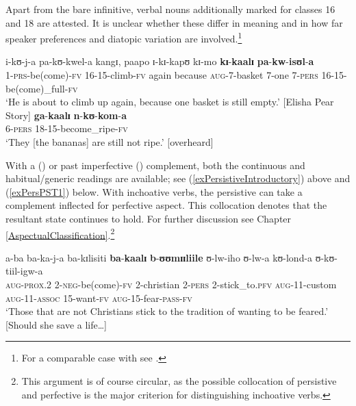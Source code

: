 \newpage 
Apart from the bare infinitive, verbal nouns additionally marked for  classes 16 and 18 are attested. It is unclear whether these differ in meaning and in how far speaker preferences and diatopic variation are involved.\footnote{For a comparable case with  see .}

\begin{exe}
\ex \label{exPers16INF}
\gll i-kʊ-j-a pa-kʊ-kwel-a kangɪ, paapo ɪ-kɪ-kapʊ kɪ-mo \textbf{kɪ}-\textbf{kaalɪ} \textbf{pa}-\textbf{kw}-\textbf{isʊl}-\textbf{a}\\
1-\textsc{prs}-be(come)-\textsc{fv} 16-15-climb-\textsc{fv} again because \textsc{aug}-7-basket 7-one 7-\textsc{pers} 16-15-be(come)\_full-\textsc{fv}\\
\glt \lq He is about to climb up again, because one basket is still empty.' [Elisha Pear Story]
\ex \label{exPers18INF}
\gll \textbf{ga}-\textbf{kaalɪ} \textbf{n}-\textbf{kʊ}-\textbf{kom}-\textbf{a}\\
6-\textsc{pers} 18-15-become\_ripe-\textsc{fv}\\
\glt \lq They [the bananas] are still not ripe.' [overheard]
\end{exe} 

With a  () or past imperfective () complement, both the continuous and habitual/generic readings are available; see (\ref{exPersistiveIntroductory}) above and (\ref{exPersPST1}) below. With inchoative verbs, the persistive can take a complement inflected for perfective aspect. This collocation denotes that the resultant state continues to hold. For further discussion see Chapter \ref{AspectualClassification}.\footnote{This argument is of course circular, as the possible collocation of persistive and perfective is the major criterion for distinguishing inchoative verbs.}

\begin{exe}
\ex \gll a-ba ba-ka-j-a ba-kɪlisiti \textbf{ba}-\textbf{kaalɪ} \textbf{b}-\textbf{ʊʊmɪɪliile} ʊ-lw-iho ʊ-lw-a kʊ-lond-a ʊ-kʊ-tiil-igw-a\\
\textsc{aug}-\textsc{prox.2} 2-\textsc{neg}-be(come)-\textsc{fv} 2-christian 2-\textsc{pers} 2-stick\_to.\textsc{pfv} \textsc{aug}-11-custom \textsc{aug}-11-\textsc{assoc} 15-want-\textsc{fv} \textsc{aug}-15-fear-\textsc{pass}-\textsc{fv}\\
\glt `Those that are not Christians stick to the tradition of wanting to be feared.' [Should she save a life\ldots]
\end{exe}

